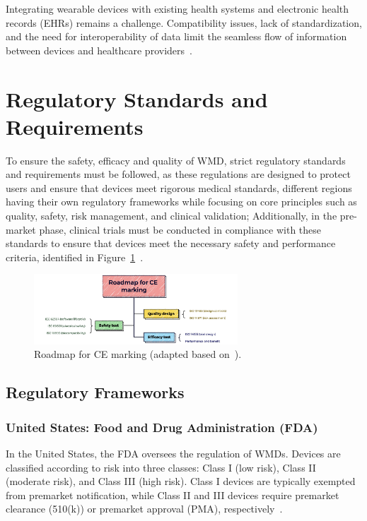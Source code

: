 \documentclass[journal]{IEEEtran}
\begin{document}
        Integrating wearable devices with existing health systems and electronic health records (EHRs) remains a challenge. Compatibility issues, lack of standardization, and the need for interoperability of data limit the seamless flow of information between devices and healthcare providers~\cite{Ravizza2019}.

\section{Regulatory Standards and Requirements}
\label{8.Regulatory}

To ensure the safety, efficacy and quality of WMD, strict regulatory standards and requirements must be followed, as these regulations are designed to protect users and ensure that devices meet rigorous medical standards, different regions having their own regulatory frameworks while focusing on core principles such as quality, safety, risk management, and clinical validation; Additionally, in the pre-market phase, clinical trials must be conducted in compliance with these standards to ensure that devices meet the necessary safety and performance criteria, identified in Figure~\ref{fig:roadmap}~\cite{Ravizza2019,EuropeanUnion2024,Dias2018}.

\begin{figure}[!t]
\centering
\includegraphics[width=3in]{Wearables_SEB_2024-2025_Group1/Figuras/Roadmap for CE marking.jpeg}
\caption{Roadmap for CE marking (adapted based on~\cite{Ravizza2019}).}
\label{fig:roadmap}
\end{figure}

    \subsection{Regulatory Frameworks}

        \subsubsection{United States: Food and Drug Administration (FDA)}

        In the United States, the FDA oversees the regulation of WMDs. Devices are classified according to risk into three classes: Class I (low risk), Class II (moderate risk), and Class III (high risk). Class I devices are typically exempted from premarket notification, while Class II and III devices require premarket clearance (510(k)) or premarket approval (PMA), respectively~\cite{Dias2018,Ravizza2019}.
\end{document}
